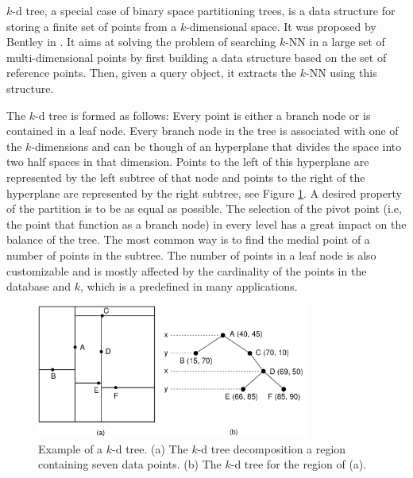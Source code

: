 \iftoggle{edit-mode}{\hspace{0pt}\hspace{0pt}\marginpar{A short introduction to $k$-d tree}}{} 
$k$-d tree, a special case of binary space partitioning trees, is a data structure for storing a finite set of points from a $k$-dimensional space. It was proposed by Bentley in \cite{bentley1975multidimensional}. It aims at solving the problem of searching $k$-NN in a large set of multi-dimensional points by first building a data structure based on the set of reference points. Then, given a query object, it extracts the $k$-NN using this structure.

\iftoggle{edit-mode}{\hspace{0pt}\marginpar{How it works, how the data is saved and extracted}}{} 
The $k$-d tree is formed as follows: Every point is either a branch node or is contained in a leaf node. Every branch node in the tree is associated with one of the $k$-dimensions and can be though of an hyperplane that divides the space into two half spaces in that dimension. Points to the left of this hyperplane are represented by the left subtree of that node and points to the right of the hyperplane are represented by the right subtree, see Figure \ref{fig:kd_tree}. A desired property of the partition is to be as equal as possible. The selection of the pivot point (i.e,  the point that function as a branch node) in every level has a great impact on the balance of the tree. The most common way is to find the medial point of a number of points in the subtree. The number of points in a leaf node is also customizable and is mostly affected by the cardinality of the points in the database and $k$, which is a predefined in many applications.

\begin{figure}
\centering
\includegraphics[width=0.8\textwidth]{./figures/kd_tree}       
\caption{Example of a $k$-d tree. (a) The $k$-d tree decomposition  a region containing seven data points. (b) The $k$-d tree for the region of (a).}
\label{fig:kd_tree}
\end{figure}

